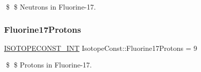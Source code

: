 \$ \$ Neutrons in Fluorine-\/17. \mbox{\label{group___isotope_const-_fluorine-_f17_ga8910b453f67679d7037182df2d1e8fe3}} 
\subsubsection{\texorpdfstring{Fluorine17\+Protons}{Fluorine17Protons}}
{\footnotesize\ttfamily \mbox{\hyperlink{group___isotope_const-_macros_ga5f18360b3e99483a35c32d789e62621c}{I\+S\+O\+T\+O\+P\+E\+C\+O\+N\+S\+T\+\_\+\+I\+NT}} Isotope\+Const\+::\+Fluorine17\+Protons = 9}

\$ \$ Protons in Fluorine-\/17. 